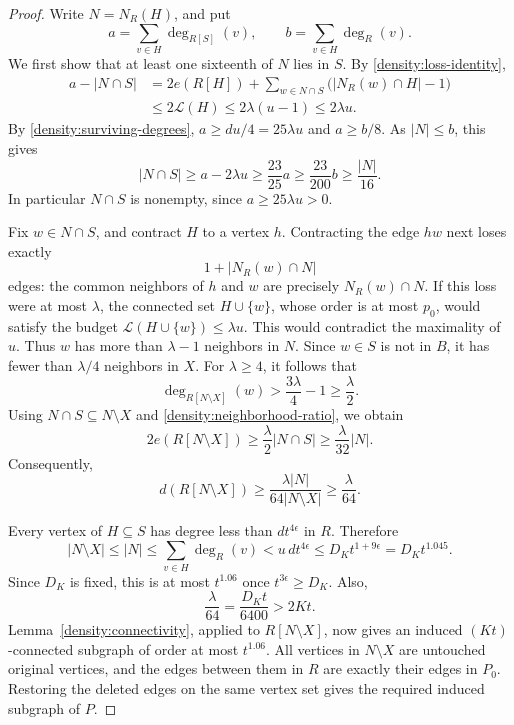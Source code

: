 \begin{proof}
Write \(N=N_R(H)\), and put
\[
 a=\sum_{v\in H}\deg_{R[S]}(v),
 \qquad
 b=\sum_{v\in H}\deg_R(v).
\]
We first show that at least one sixteenth of \(N\) lies in \(S\).
By \eqref{density:loss-identity},
\[
 \begin{aligned}
 a-|N\cap S|
 &=2e(R[H])
   +\sum_{w\in N\cap S}\bigl(|N_R(w)\cap H|-1\bigr)\\
 &\le2\mathcal L(H)\le2\lambda(u-1)\le2\lambda u.
 \end{aligned}
\]
By \eqref{density:surviving-degrees},
\(a\ge du/4=25\lambda u\) and \(a\ge b/8\).
As \(|N|\le b\), this gives
\begin{equation}\label{density:neighborhood-ratio}
 |N\cap S|
 \ge a-2\lambda u
 \ge\frac{23}{25}a
 \ge\frac{23}{200}b
 \ge\frac{|N|}{16}.
\end{equation}
In particular \(N\cap S\) is nonempty, since \(a\ge25\lambda u>0\).

Fix \(w\in N\cap S\), and contract \(H\) to a vertex \(h\).
Contracting the edge \(hw\) next loses exactly
\[
 1+|N_R(w)\cap N|
\]
edges: the common neighbors of \(h\) and \(w\) are precisely
\(N_R(w)\cap N\).
If this loss were at most \(\lambda\), the connected set
\(H\cup\{w\}\), whose order is at most \(p_0\), would satisfy
the budget \(\mathcal L(H\cup\{w\})\le\lambda u\).
This would contradict the maximality of \(u\).
Thus \(w\) has more than \(\lambda-1\) neighbors in \(N\).
Since \(w\in S\) is not in \(B\), it has fewer than \(\lambda/4\)
neighbors in \(X\). For \(\lambda\ge4\), it follows that
\[
 \deg_{R[N\setminus X]}(w)
 >\frac{3\lambda}{4}-1
 \ge\frac{\lambda}{2}.
\]
Using \(N\cap S\subseteq N\setminus X\) and
\eqref{density:neighborhood-ratio}, we obtain
\[
 2e(R[N\setminus X])
 \ge\frac{\lambda}{2}|N\cap S|
 \ge\frac{\lambda}{32}|N|.
\]
Consequently,
\begin{equation}\label{density:small-neighborhood-density}
 d(R[N\setminus X])
 \ge\frac{\lambda|N|}{64|N\setminus X|}
 \ge\frac{\lambda}{64}.
\end{equation}

Every vertex of \(H\subseteq S\) has degree less than \(dt^{4\epsilon}\)
in \(R\). Therefore
\[
 |N\setminus X|
 \le |N|
 \le\sum_{v\in H}\deg_R(v)
 <u\,dt^{4\epsilon}
 \le D_Kt^{1+9\epsilon}
 =D_Kt^{1.045}.
\]
Since \(D_K\) is fixed, this is at most \(t^{1.06}\) once
\(t^{3\epsilon}\ge D_K\).
Also,
\[
 \frac{\lambda}{64}=\frac{D_Kt}{6400}>2Kt.
\]
Lemma~\ref{density:connectivity}, applied to \(R[N\setminus X]\),
now gives an induced \((Kt)\)-connected subgraph of order at most
\(t^{1.06}\). All vertices in \(N\setminus X\) are untouched original
vertices, and the edges between them in \(R\) are exactly their edges
in \(P_0\). Restoring the deleted edges on the same vertex set gives
the required induced subgraph of \(P\).
\end{proof}

